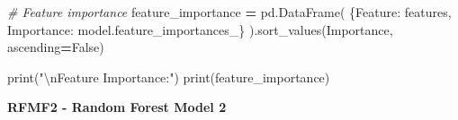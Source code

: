 \documentclass[mstat,12pt]{unswthesis}
\newenvironment{Shaded}{\begin{snugshade}}{\end{snugshade}}
\newcommand{\BuiltInTok}[1]{#1}
\newcommand{\CharTok}[1]{\textcolor[rgb]{0.31,0.60,0.02}{#1}}
\newcommand{\CommentTok}[1]{\textcolor[rgb]{0.56,0.35,0.01}{\textit{#1}}}
\newcommand{\NormalTok}[1]{#1}
\newcommand{\OperatorTok}[1]{\textcolor[rgb]{0.81,0.36,0.00}{\textbf{#1}}}
\newcommand{\StringTok}[1]{\textcolor[rgb]{0.31,0.60,0.02}{#1}}
\newcommand{\VariableTok}[1]{\textcolor[rgb]{0.00,0.00,0.00}{#1}}
\begin{document}
\begin{Shaded}
\begin{Highlighting}[]
\CommentTok{\# Feature importance}
\NormalTok{feature\_importance }\OperatorTok{=}\NormalTok{ pd.DataFrame(}
\NormalTok{    \{}\StringTok{\textquotesingle{}Feature\textquotesingle{}}\NormalTok{: features,}
     \StringTok{\textquotesingle{}Importance\textquotesingle{}}\NormalTok{: model.feature\_importances\_\}}
\NormalTok{).sort\_values(}\StringTok{\textquotesingle{}Importance\textquotesingle{}}\NormalTok{, ascending}\OperatorTok{=}\VariableTok{False}\NormalTok{)}

\BuiltInTok{print}\NormalTok{(}\StringTok{"}\CharTok{\textbackslash{}n}\StringTok{Feature Importance:"}\NormalTok{)}
\BuiltInTok{print}\NormalTok{(feature\_importance)}
\end{Highlighting}
\end{Shaded}

\noindent \textbf{RFMF2 - Random Forest Model 2}
\end{document}
